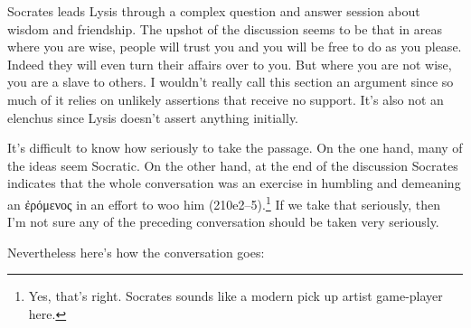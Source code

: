 \documentclass[11pt]{article}
\begin{document}
Socrates leads Lysis through a complex question and answer session about
wisdom and friendship.  The upshot of the discussion seems to be that in
areas where you are wise, people will trust you and you will be free to do
as you please.  Indeed they will even turn their affairs over to you.  But
where you are not wise, you are a slave to others.  I wouldn't really call
this section an argument since so much of it relies on unlikely assertions
that receive no support.  It's also not an elenchus since Lysis doesn't
assert anything initially.

It's difficult to know how seriously to take the passage.  On the one hand,
many of the ideas seem Socratic.  On the other hand, at the end of the
discussion Socrates indicates that the whole conversation was an exercise
in humbling and demeaning an {\g ἐρόμενος} in an effort to woo him
(210e2--5).\footnote{Yes, that's right.  Socrates sounds like a modern pick
up artist game-player here.}  If we take that seriously, then I'm not sure
any of the preceding conversation should be taken very seriously.

Nevertheless here's how the conversation goes:
\end{document}
